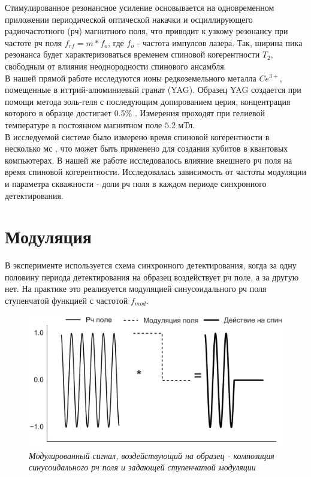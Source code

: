\documentclass[a4paper,12pt]{article}
\begin{document}
Стимулированное резонансное усиление основывается на одновременном приложении периодической оптической накачки и осциллирующего радиочастотного (рч) магнитного поля, что приводит к узкому резонансу при частоте рч поля $f_{rf} = m*f_o$, где $f_o$ - частота импулсов лазера. Так, ширина пика резонанса будет характеризоваться временем спиновой когерентности $T_2$, свободным от влияния неоднородности спинового ансамбля. \\

В нашей прямой работе исследуются ионы редкоземельного металла $Ce^{3+}$, помещенные в иттрий-алюминиевый гранат (YAG). Образец YAG создается при помощи метода золь-геля с последующим допированием церия, концентрация которого в образце достигает 0.5\% \cite{YAG}.
Измерения проходят при гелиевой температуре в постоянном магнитном поле $5.2$ мТл. \\

В исследуемой системе было измерено время спиновой когерентности в несколько мс \cite{spin amplification}, что может быть применено для создания кубитов в квантовых компьютерах. В нашей же работе исследовалось влияние внешнего рч поля на время спиновой когерентности. Исследовалась зависимость от частоты модуляции и параметра скважности - доли рч поля в каждом периоде синхронного детектирования.\\

\section{Модуляция}

В эксперименте используется схема синхронного детектирования, когда за одну половину периода детектирования на образец воздействует рч поле, а за другую нет. На практике это реализуется модуляцией синусоидального рч поля ступенчатой функцией с частотой $f_{mod}$.

\begin{figure}
	\includegraphics[scale = 0.35]{modulation_rf.png}
	\caption{\textit{Модулированный сигнал, воздействующий на образец - композиция синусоидального рч поля и задающей ступенчатой модуляции}}
	\label{fig:modulation_rf}
\end{figure}
\end{document}

